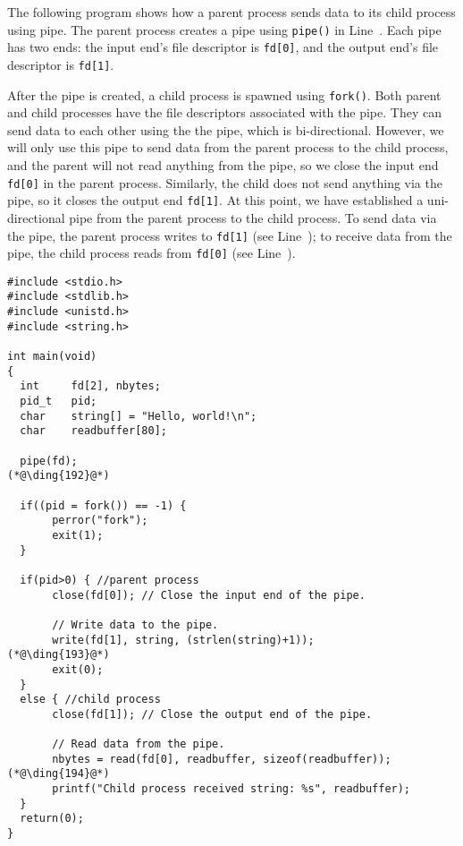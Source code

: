 The following program shows how a parent process sends data to its child process using 
pipe. The parent process creates a pipe using \texttt{pipe()} in Line~. 
Each pipe has two ends: the input end's file descriptor is \texttt{fd[0]}, and 
the output end's file descriptor is \texttt{fd[1]}. 

After the pipe is created, a child process is spawned using \texttt{fork()}. 
Both parent and child processes have the
file descriptors associated with the pipe. They can send data to each other using the 
the pipe, which is bi-directional. However, we will only use this pipe to send data from the
parent process to the child process, and the parent will not read anything from the pipe, so 
we close the input end \texttt{fd[0]} in the parent process. Similarly, the child does not
send anything via the pipe, so it closes the output end \texttt{fd[1]}.  
At this point, we have established a uni-directional pipe from the parent process to the child process. 
To send data via the pipe, the parent process writes to \texttt{fd[1]} (see Line~);
to receive data from the pipe, the child process reads from \texttt{fd[0]} (see
Line~).  



\begin{lstlisting}
#include <stdio.h>
#include <stdlib.h>
#include <unistd.h>
#include <string.h>

int main(void)
{
  int     fd[2], nbytes;
  pid_t   pid;
  char    string[] = "Hello, world!\n";
  char    readbuffer[80];

  pipe(fd);                                                  (*@\ding{192}@*)
        
  if((pid = fork()) == -1) {
       perror("fork");
       exit(1);
  }

  if(pid>0) { //parent process 
       close(fd[0]); // Close the input end of the pipe. 

       // Write data to the pipe.
       write(fd[1], string, (strlen(string)+1));             (*@\ding{193}@*)
       exit(0);
  }
  else { //child process
       close(fd[1]); // Close the output end of the pipe.

       // Read data from the pipe.
       nbytes = read(fd[0], readbuffer, sizeof(readbuffer)); (*@\ding{194}@*)
       printf("Child process received string: %s", readbuffer);
  }
  return(0);
}
\end{lstlisting}
 



